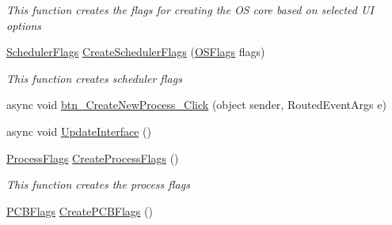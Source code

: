 \begin{DoxyCompactItemize}
\begin{DoxyCompactList}\small\item\em This function creates the flags for creating the O\+S core based on selected U\+I options \end{DoxyCompactList}\item 
\hyperlink{struct_c_p_u___o_s___simulator_1_1_operating___system_1_1_scheduler_flags}{Scheduler\+Flags} \hyperlink{class_c_p_u___o_s___simulator_1_1_operating_system_main_window_affe29a16b5dcb4faa896fd12b87268f6}{Create\+Scheduler\+Flags} (\hyperlink{struct_c_p_u___o_s___simulator_1_1_operating___system_1_1_o_s_flags}{O\+S\+Flags} flags)
\begin{DoxyCompactList}\small\item\em This function creates scheduler flags \end{DoxyCompactList}\item 
async void \hyperlink{class_c_p_u___o_s___simulator_1_1_operating_system_main_window_a07752984a7eedac5dab517b7f57b9af2}{btn\+\_\+\+Create\+New\+Process\+\_\+\+Click} (object sender, Routed\+Event\+Args e)
\item 
async void \hyperlink{class_c_p_u___o_s___simulator_1_1_operating_system_main_window_a531d8240782c578c6fc5984c703ddffb}{Update\+Interface} ()
\item 
\hyperlink{struct_c_p_u___o_s___simulator_1_1_operating___system_1_1_process_flags}{Process\+Flags} \hyperlink{class_c_p_u___o_s___simulator_1_1_operating_system_main_window_aa44b77efc3ae2c300ebb19e6854c3290}{Create\+Process\+Flags} ()
\begin{DoxyCompactList}\small\item\em This function creates the process flags \end{DoxyCompactList}\item 
\hyperlink{struct_c_p_u___o_s___simulator_1_1_operating___system_1_1_p_c_b_flags}{P\+C\+B\+Flags} \hyperlink{class_c_p_u___o_s___simulator_1_1_operating_system_main_window_a0994a475aa1e602964f610cce778b117}{Create\+P\+C\+B\+Flags} ()
\end{DoxyCompactItemize}
